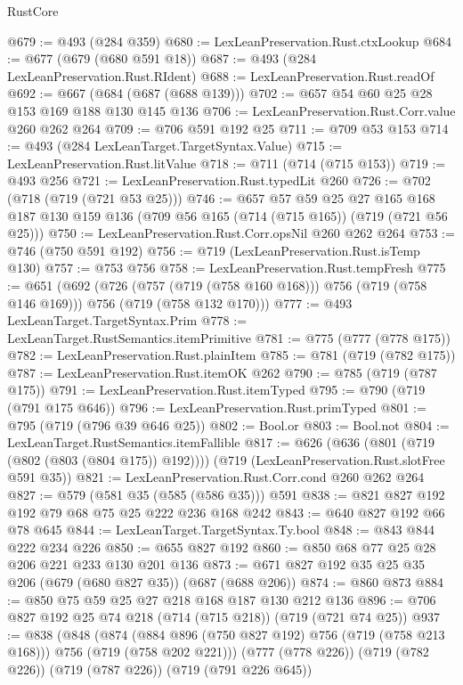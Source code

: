 \begin{lexlean}{RustCore}
\begin{coremodule}
@679 := @493 (@284 @359)
@680 := LexLeanPreservation.Rust.ctxLookup
@684 := @677 (@679 (@680 @591 @18))
@687 := @493 (@284 LexLeanPreservation.Rust.RIdent)
@688 := LexLeanPreservation.Rust.readOf
@692 := @667 (@684 (@687 (@688 @139)))
@702 := @657 @54 @60 @25 @28 @153 @169 @188 @130 @145 @136
@706 := LexLeanPreservation.Rust.Corr.value @260 @262 @264
@709 := @706 @591 @192 @25
@711 := @709 @53 @153
@714 := @493 (@284 LexLeanTarget.TargetSyntax.Value)
@715 := LexLeanPreservation.Rust.litValue
@718 := @711 (@714 (@715 @153))
@719 := @493 @256
@721 := LexLeanPreservation.Rust.typedLit @260
@726 := @702 (@718 (@719 (@721 @53 @25)))
@746 := @657
    @57
    @59
    @25
    @27
    @165
    @168
    @187
    @130
    @159
    @136
    (@709 @56 @165 (@714 (@715 @165)) (@719 (@721 @56 @25)))
@750 := LexLeanPreservation.Rust.Corr.opsNil @260 @262 @264
@753 := @746 (@750 @591 @192)
@756 := @719 (LexLeanPreservation.Rust.isTemp @130)
@757 := @753 @756
@758 := LexLeanPreservation.Rust.tempFresh
@775 := @651
    (@692
      (@726 (@757 (@719 (@758 @160 @168))) @756 (@719 (@758 @146 @169)))
      @756
      (@719 (@758 @132 @170)))
@777 := @493 LexLeanTarget.TargetSyntax.Prim
@778 := LexLeanTarget.RustSemantics.itemPrimitive
@781 := @775 (@777 (@778 @175))
@782 := LexLeanPreservation.Rust.plainItem
@785 := @781 (@719 (@782 @175))
@787 := LexLeanPreservation.Rust.itemOK @262
@790 := @785 (@719 (@787 @175))
@791 := LexLeanPreservation.Rust.itemTyped
@795 := @790 (@719 (@791 @175 @646))
@796 := LexLeanPreservation.Rust.primTyped
@801 := @795 (@719 (@796 @39 @646 @25))
@802 := Bool.or
@803 := Bool.not
@804 := LexLeanTarget.RustSemantics.itemFallible
@817 := @626
    (@636 (@801 (@719 (@802 (@803 (@804 @175)) @192))))
    (@719 (LexLeanPreservation.Rust.slotFree @591 @35))
@821 := LexLeanPreservation.Rust.Corr.cond @260 @262 @264
@827 := @579 (@581 @35 (@585 (@586 @35))) @591
@838 := @821 @827 @192 @192 @79 @68 @75 @25 @222 @236 @168 @242
@843 := @640 @827 @192 @66 @78 @645
@844 := LexLeanTarget.TargetSyntax.Ty.bool
@848 := @843 @844 @222 @234 @226
@850 := @655 @827 @192
@860 := @850 @68 @77 @25 @28 @206 @221 @233 @130 @201 @136
@873 := @671 @827 @192 @35 @25 @35 @206 (@679 (@680 @827 @35)) (@687 (@688 @206))
@874 := @860 @873
@884 := @850 @75 @59 @25 @27 @218 @168 @187 @130 @212 @136
@896 := @706 @827 @192 @25 @74 @218 (@714 (@715 @218)) (@719 (@721 @74 @25))
@937 := @838
    (@848
      (@874 (@884 @896 (@750 @827 @192) @756 (@719 (@758 @213 @168))) @756 (@719 (@758 @202 @221)))
      (@777 (@778 @226))
      (@719 (@782 @226))
      (@719 (@787 @226))
      (@719 (@791 @226 @645))

\end{coremodule}
\end{lexlean}
